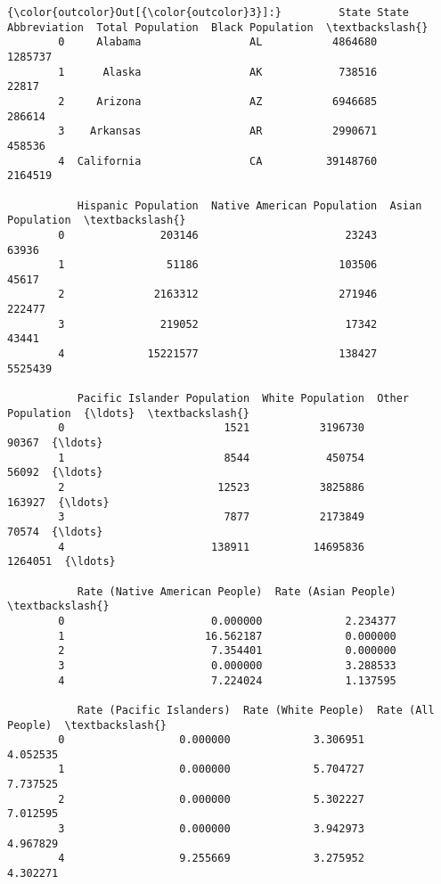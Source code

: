 \documentclass[11pt]{article}
\begin{document}
\begin{Verbatim}[commandchars=\\\{\}]
{\color{outcolor}Out[{\color{outcolor}3}]:}         State State Abbreviation  Total Population  Black Population  \textbackslash{}
        0     Alabama                 AL           4864680           1285737   
        1      Alaska                 AK            738516             22817   
        2     Arizona                 AZ           6946685            286614   
        3    Arkansas                 AR           2990671            458536   
        4  California                 CA          39148760           2164519   
        
           Hispanic Population  Native American Population  Asian Population  \textbackslash{}
        0               203146                       23243             63936   
        1                51186                      103506             45617   
        2              2163312                      271946            222477   
        3               219052                       17342             43441   
        4             15221577                      138427           5525439   
        
           Pacific Islander Population  White Population  Other Population  {\ldots}  \textbackslash{}
        0                         1521           3196730             90367  {\ldots}   
        1                         8544            450754             56092  {\ldots}   
        2                        12523           3825886            163927  {\ldots}   
        3                         7877           2173849             70574  {\ldots}   
        4                       138911          14695836           1264051  {\ldots}   
        
           Rate (Native American People)  Rate (Asian People)  \textbackslash{}
        0                       0.000000             2.234377   
        1                      16.562187             0.000000   
        2                       7.354401             0.000000   
        3                       0.000000             3.288533   
        4                       7.224024             1.137595   
        
           Rate (Pacific Islanders)  Rate (White People)  Rate (All People)  \textbackslash{}
        0                  0.000000             3.306951           4.052535   
        1                  0.000000             5.704727           7.737525   
        2                  0.000000             5.302227           7.012595   
        3                  0.000000             3.942973           4.967829   
        4                  9.255669             3.275952           4.302271   
        

\end{Verbatim}
\end{document}
